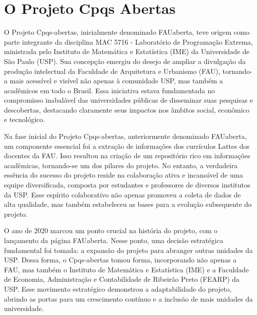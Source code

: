 


\chapter{O Projeto Cpqs Abertas}
\label{chap:o-projeto}

O Projeto Cpqs-abertas, inicialmente denominado FAUaberta, teve origem como parte integrante da disciplina MAC 5716 - Laboratório de Programação Extrema, ministrada pelo Instituto de Matemática e Estatística (IME) da Universidade de São Paulo (USP). Sua concepção emergiu do desejo de ampliar a divulgação da produção intelectual da Faculdade de Arquitetura e Urbanismo (FAU), tornando-a mais acessível e visível não apenas à comunidade USP, mas também a acadêmicos em todo o Brasil. Essa iniciativa estava fundamentada no compromisso inabalável das universidades públicas de disseminar suas pesquisas e descobertas, destacando claramente seus impactos nos âmbitos social, econômico e tecnológico.

Na fase inicial do Projeto Cpqs-abertas, anteriormente denominado FAUaberta, um componente essencial foi a extração de informações dos currículos Lattes dos docentes da FAU. Isso resultou na criação de um repositório rico em informações acadêmicas, tornando-se um dos pilares do projeto. No entanto, a verdadeira essência do sucesso do projeto reside na colaboração ativa e incansável de uma equipe diversificada, composta por estudantes e professores de diversos institutos da USP. Esse espírito colaborativo não apenas promoveu a coleta de dados de alta qualidade, mas também estabeleceu as bases para a evolução subsequente do projeto.

O ano de 2020 marcou um ponto crucial na história do projeto, com o lançamento da página FAUaberta. Nesse ponto, uma decisão estratégica fundamental foi tomada: a expansão do projeto para abranger outras unidades da USP. Dessa forma, o Cpqs-abertas tomou forma, incorporando não apenas a FAU, mas também o Instituto de Matemática e Estatística (IME) e a Faculdade de Economia, Administração e Contabilidade de Ribeirão Preto (FEARP) da USP. Esse movimento estratégico demonstrou a adaptabilidade do projeto, abrindo as portas para um crescimento contínuo e a inclusão de mais unidades da universidade.

